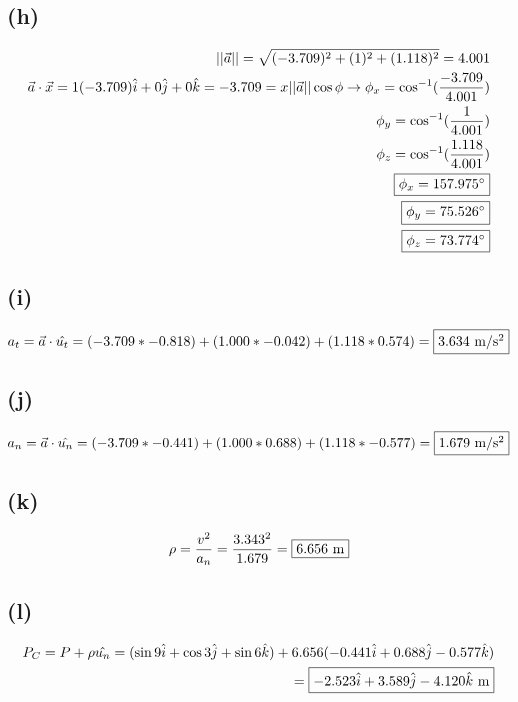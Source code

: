 \documentclass[12 pt]{article}
\begin{document}
\subsection*{(h)}
\begin{align*}
    ||\vec{a}||=\sqrt{(-3.709)^2 + (1)^2 + (1.118)^2}=4.001 \\
    \vec{a}\cdot \vec{x}=1(-3.709)\hat{i} + 0\hat{j} + 0\hat{k}=-3.709=x||\vec{a}||\cos{\phi} \rightarrow
    \phi_x=\cos^{-1}(\frac{-3.709}{4.001}) \\
    \phi_y=\cos^{-1}(\frac{1}{4.001}) \\
    \phi_z=\cos^{-1}(\frac{1.118}{4.001}) \\
    \fbox{$\phi_x=157.975^\circ$} \\
    \fbox{$\phi_y=75.526^\circ$} \\
    \fbox{$\phi_z=73.774^\circ$}
\end{align*}

\subsection*{(i)}
\begin{align*}
    a_t=\vec{a}\cdot \hat{u_t}=(-3.709*-0.818) + (1.000*-0.042) + (1.118*0.574) = \fbox{$3.634$ m/s$^2$}
\end{align*}

\subsection*{(j)}
\begin{align*}
    a_n=\vec{a}\cdot \hat{u_n}=(-3.709*-0.441) + (1.000*0.688) + (1.118*-0.577) = \fbox{$1.679$ m/s$^2$}
\end{align*}

\subsection*{(k)}
\begin{align*}
    \rho=\frac{v^2}{a_n}=\frac{3.343^2}{1.679}=\fbox{$6.656$ m}
\end{align*}

\subsection*{(l)}
\begin{align*}
    P_C=P+\rho \hat{u_n}=(\sin{9}\hat{i} + \cos{3}\hat{j} + \sin{6}\hat{k}) + 6.656(-0.441\hat{i} + 0.688\hat{j} -0.577\hat{k}) \\
    =\fbox{$-2.523\hat{i} + 3.589\hat{j} - 4.120\hat{k}$ m}
\end{align*}
\end{document}
